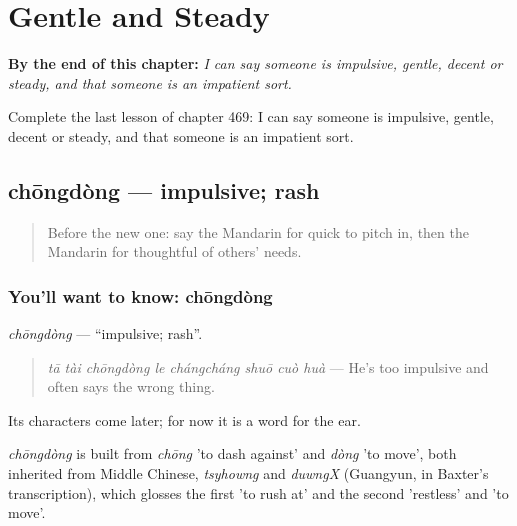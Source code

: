 
\chapter{Gentle and Steady}
\label{ch:zh-gentle-and-steady}

\begin{chapteropening}
\textbf{By the end of this chapter:} \emph{I can say someone is impulsive, gentle, decent or steady, and that someone is an impatient sort.}

Complete the last lesson of chapter 469: I can say someone is impulsive, gentle, decent or steady, and that someone is an impatient sort.
\end{chapteropening}

\section[chōngdòng]{chōngdòng — impulsive; rash}

\label{lesson:ZH-C469-chongdong}



\begin{quote}
Before the new one: say the Mandarin for quick to pitch in, then the Mandarin for thoughtful of others' needs.
\end{quote}

\subsection*{You'll want to know: chōngdòng}
\emph{chōngdòng} — \textquotedblleft{}impulsive; rash\textquotedblright{}.

\begin{quote}
\emph{tā tài chōngdòng le chángcháng shuō cuò huà} — He's too impulsive and often says the wrong thing.
\end{quote}

Its characters come later; for now it is a word for the ear.

\begin{cousinweb}
\emph{chōngdòng} is built from \emph{chōng} 'to dash against' and \emph{dòng} 'to move', both inherited from Middle Chinese, \emph{tsyhowng} and \emph{duwngX} (Guangyun, in Baxter's transcription), which glosses the first 'to rush at' and the second 'restless' and 'to move'.
\end{cousinweb}

